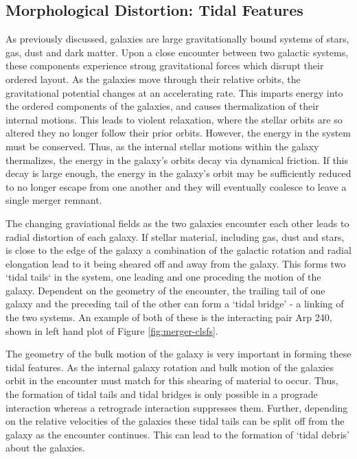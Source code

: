 \subsection{Morphological Distortion: Tidal Features}
\noindent As previously discussed, galaxies are large gravitationally bound systems of stars, gas, dust and dark matter. Upon a close encounter between two galactic systems, these components experience strong gravitational forces which disrupt their ordered layout. As the galaxies move through their relative orbits, the gravitational potential changes at an accelerating rate. This imparts energy into the ordered components of the galaxies, and causes thermalization of their internal motions. This leads to violent relaxation, where the stellar orbits are so altered they no longer follow their prior orbits. However, the energy in the system must be conserved. Thus, as the internal stellar motions within the galaxy thermalizes, the energy in the galaxy's orbits decay via dynamical friction. If this decay is large enough, the energy in the galaxy's orbit may be sufficiently reduced to no longer escape from one another and they will eventually coalesce to leave a single merger remnant. 

The changing graviational fields as the two galaxies encounter each other leads to radial distortion of each galaxy. If stellar material, including gas, dust and stars, is close to the edge of the galaxy a combination of the galactic rotation and radial elongation lead to it being sheared off and away from the galaxy. This forms two `tidal tails` in the system, one leading and one proceding the motion of the galaxy. Dependent on the geometry of the encounter, the trailing tail of one galaxy and the preceding tail of the other can form a `tidal bridge' - a linking of the two systems. An example of both of these is the interacting pair Arp 240, shown in left hand plot of Figure \ref{fig:merger-clsfs}. 

The geometry of the bulk motion of the galaxy is very important in forming these tidal features. As the internal galaxy rotation and bulk motion of the galaxies orbit in the encounter must match for this shearing of material to occur. Thus, the formation of tidal tails and tidal bridges is only possible in a prograde interaction whereas a retrograde interaction suppresses them. Further, depending on the relative velocities of the galaxies these tidal tails can be split off from the galaxy as the encounter continues. This can lead to the formation of `tidal debris' about the galaxies.

